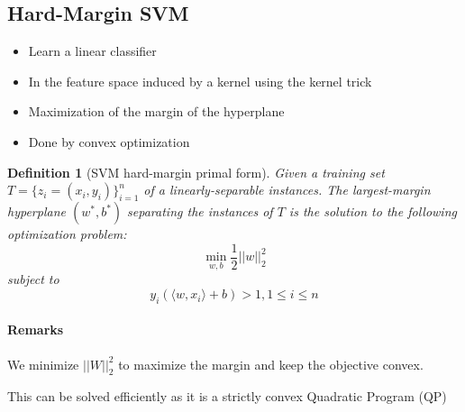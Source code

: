 \documentclass{article}
\newtheorem{defi}{Definition}
\begin{document}
\subsection{Hard-Margin SVM}
\begin{itemize}[noitemsep]
\item Learn a linear classifier
\item In the feature space induced by a kernel using the kernel trick
\item Maximization of the margin of the hyperplane
\item Done by convex optimization
\end{itemize}

\begin{defi}[SVM hard-margin primal form]
Given a training set $T=\{z_i=(x_i,y_i)\}_{i=1}^n$ of a linearly-separable instances. The largest-margin hyperplane $(w^*,b^*)$ separating the instances of $T$ is the solution to the following optimization problem:
\[\min_{w,b} \dfrac{1}{2}||w||^2_2\]
subject to
\[y_i(\langle w,x_i\rangle + b)>1, 1\leq i \leq n\]
\end{defi}

\paragraph{Remarks}
We minimize $||W||^2_2$ to maximize the margin and keep the objective convex.

This can be solved efficiently as it is a strictly convex Quadratic Program (QP)

\end{document}
